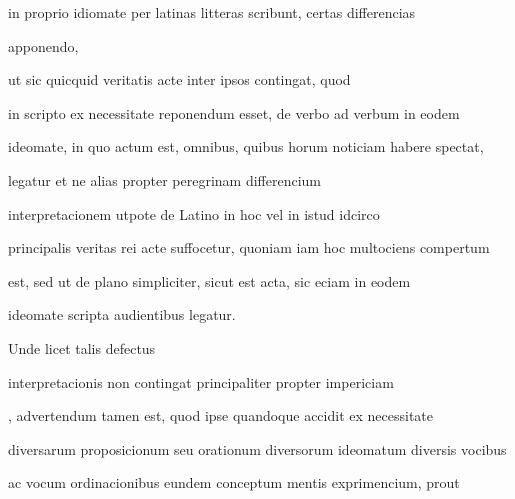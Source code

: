 in proprio idiomate per latinas litteras scribunt, certas differencias

\splitlines

apponendo, 


ut sic quicquid veritatis acte inter ipsos contingat, quod

in scripto ex necessitate reponendum esset, de verbo ad verbum in eodem

ideomate, in quo actum est, omnibus, quibus horum noticiam habere spectat,

 legatur et ne alias propter peregrinam differencium 

 interpretacionem utpote de Latino in hoc vel in istud idcirco

principalis veritas rei acte suffocetur, quoniam iam hoc multociens compertum

est, sed ut de plano simpliciter, sicut est acta, sic eciam in eodem

\splitlines


ideomate scripta audientibus legatur.



\indentK Unde licet talis defectus

\fulllines

interpretacionis non contingat principaliter propter impericiam 

, advertendum tamen est, quod ipse quandoque accidit ex necessitate

diversarum proposicionum seu orationum diversorum ideomatum diversis vocibus

ac vocum ordinacionibus eundem conceptum mentis exprimencium, prout


